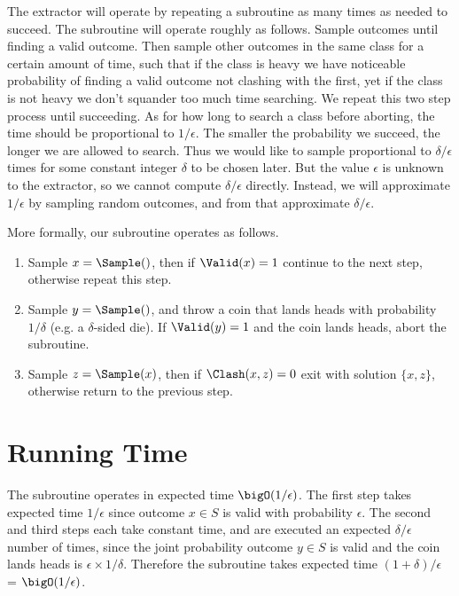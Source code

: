 The extractor will operate by repeating a subroutine as many times as needed to succeed.
The subroutine will operate roughly as follows.
Sample outcomes until finding a valid outcome.
Then sample other outcomes in the same class for a certain amount of time, such that if the class is heavy we have noticeable probability of finding a valid outcome not clashing with the first, yet if the class is not heavy we don't squander too much time searching.
We repeat this two step process until succeeding.
As for how long to search a class before aborting, the time should be proportional to $1/\epsilon$.
The smaller the probability we succeed, the longer we are allowed to search.
Thus we would like to sample proportional to $\delta/\epsilon$ times for some constant integer $\delta$ to be chosen later.
But the value $\epsilon$ is unknown to the extractor, so we cannot compute $\delta/\epsilon$ directly.
Instead, we will approximate $1/\epsilon$ by sampling random outcomes, and from that approximate $\delta/\epsilon$.

More formally, our subroutine operates as follows.
\begin{enumerate}
    \item
    Sample $x=\Sample()$, then if $\Valid(x)=1$ continue to the next step, otherwise repeat this step.

    \item
    Sample $y=\Sample()$, and throw a coin that lands heads with probability $1/\delta$ (e.g. a $\delta$-sided die).
    If $\Valid(y)=1$ and the coin lands heads, abort the subroutine.

    \item
    Sample $z=\Sample(x)$, then if $\Clash(x,z)=0$ exit with solution $\{x,z\}$, otherwise return to the previous step.
\end{enumerate}


\section{Running Time}

The subroutine operates in expected time $\bigO(1/\epsilon)$.
The first step takes expected time $1/\epsilon$ since outcome $x\in S$ is valid with probability $\epsilon$.
The second and third steps each take constant time, and are executed an expected $\delta/\epsilon$ number of times, since the joint probability outcome $y\in S$ is valid and the coin lands heads is $\epsilon\times1/\delta$.
Therefore the subroutine takes expected time $(1+\delta)/\epsilon$ = $\bigO(1/\epsilon)$.

